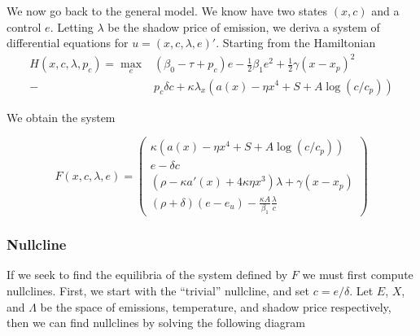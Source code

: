 \documentclass[../../main.tex]{subfiles}
\begin{document}
\renewcommand*{\arraystretch}{1.5}

We now go back to the general model. We know have two states $(x, c)$ and a control $e$. Letting $\lambda$ be the shadow price of emission, we deriva a system of differential equations for $u = (x, c, \lambda, e)'$. Starting from the Hamiltonian \begin{equation}
    \begin{split}
        H(x, c, \lambda, p_c) = \max_e &(\beta_0 - \tau + p_c) e - \frac{1}{2} \beta_1 e^2 + \frac{1}{2} \gamma (x - x_p)^2 \\
        - \ &p_c \delta c + \kappa \lambda_x(a(x) - \eta x^4 + S + A \log(c / c_p))
    \end{split}
\end{equation}

We obtain the system

\begin{equation}
    F(x, c, \lambda, e) = \begin{pmatrix}
        \kappa (a(x) - \eta x^4 + S + A \log(c / c_p)) \\
        e - \delta c \\
        (\rho - \kappa a'(x) + 4 \kappa \eta x^3) \lambda + \gamma (x - x_p) \\
        (\rho + \delta) (e - e_u) - \frac{\kappa A}{\beta_1} \frac{\lambda}{c}
    \end{pmatrix}
\end{equation}

\subsubsection{Nullcline}

If we seek to find the equilibria of the system defined by $F$ we must first compute nullclines. First, we start with the ``trivial'' nullcline, and set $c = e / \delta$. Let $E$, $X$, and $\Lambda$ be the space of emissions, temperature, and shadow price respectively, then we can find nullclines by solving the following diagram

\begin{center}
\end{center}
\end{document}
